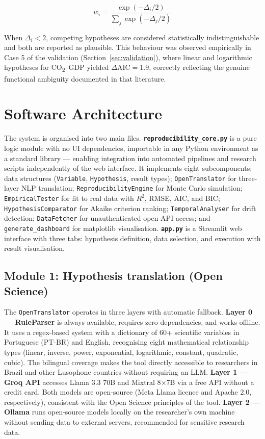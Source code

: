 \documentclass[12pt,a4paper]{article}
\begin{document}
\begin{equation}
  w_i = \frac{\exp(-\Delta_i / 2)}{\sum_j \exp(-\Delta_j / 2)}
  \label{eq:akaike}
\end{equation}

When $\Delta_i < 2$, competing hypotheses are considered statistically
indistinguishable and both are reported as plausible. This behaviour was observed
empirically in Case 5 of the validation (Section~\ref{sec:validation}), where linear and
logarithmic hypotheses for CO\textsubscript{2}--GDP yielded $\Delta \text{AIC} = 1.9$,
correctly reflecting the genuine functional ambiguity documented in that
literature.

\section{Software Architecture}

The system is organised into two main files. \textbf{\texttt{reproducibility\_core.py}} is a
pure logic module with no UI dependencies, importable in any Python environment
as a standard library --- enabling integration into automated pipelines and
research scripts independently of the web interface. It implements eight
subcomponents: data structures (\texttt{Variable}, \texttt{Hypothesis}, result types);
\texttt{OpenTranslator} for three-layer NLP translation; \texttt{ReproducibilityEngine} for
Monte Carlo simulation; \texttt{EmpiricalTester} for fit to real data with $R^2$, RMSE,
AIC, and BIC; \texttt{HypothesisComparator} for Akaike criterion ranking;
\texttt{TemporalAnalyser} for drift detection; \texttt{DataFetcher} for unauthenticated open
API access; and \texttt{generate\_dashboard} for matplotlib visualisation. \textbf{\texttt{app.py}}
is a Streamlit web interface with three tabs: hypothesis definition, data
selection, and execution with result visualisation.

\subsection{Module 1: Hypothesis translation (Open Science)}

The \texttt{OpenTranslator} operates in three layers with automatic fallback.
\textbf{Layer 0 --- RuleParser} is always available, requires zero dependencies, and
works offline. It uses a regex-based system with a dictionary of 60+ scientific
variables in Portuguese (PT-BR) and English, recognising eight mathematical
relationship types (linear, inverse, power, exponential, logarithmic, constant,
quadratic, cubic). The bilingual coverage makes the tool directly accessible to
researchers in Brazil and other Lusophone countries without requiring an LLM.
\textbf{Layer 1 --- Groq API} accesses Llama 3.3 70B \parencite{meta2024llama3} and
Mixtral 8$\times$7B \parencite{mistral2023} via a free API without a credit card. Both models
are open-source (Meta Llama licence and Apache 2.0, respectively), consistent
with the Open Science principles of the tool. \textbf{Layer 2 --- Ollama} runs
open-source models locally on the researcher's own machine without sending data
to external servers, recommended for sensitive research data.
\end{document}
